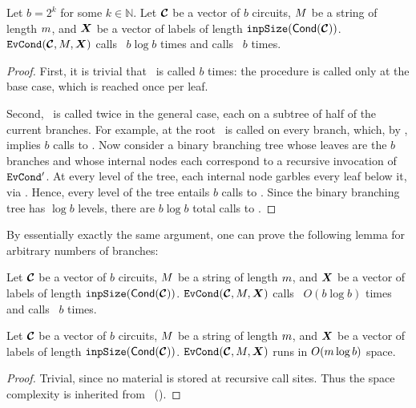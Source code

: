 \begin{lemma}\label{lemma:evcondtime}
  Let $b = 2^k$ for some $k \in \mathbb{N}$.
  Let $\vec{\cir}$ be a vector of $b$ circuits, $M$ be a string of
  length $m$, and $\gcirinp$ be a vector of labels of length
  $\inpsize(\conditional(\vec{\cir}))$.
  $\evcond(\vec{\cir}, \mat, \gcirinp)$ calls \gGb\ $b \log b$ times
  and calls \gEv\ $b$ times.
\end{lemma}
\begin{proof}
  First, it is trivial that \gEv\ is called $b$ times: the
  procedure is called only at the base case, which is reached once per
  leaf.

  Second, \gbtree\ is called twice in the general case, each on a
  subtree of half of the current branches.
  For example, at the root \gbtree\ is called on every branch, which, by
  , implies $b$ calls to \Gb.
  Now consider a binary branching tree whose leaves are the $b$
  branches and whose internal nodes each correspond to
  a recursive invocation of $\mathtt{EvCond}'$.
  At every level of the tree, each internal node garbles every
  leaf below it, via \gbtree.
  Hence, every level of the tree entails $b$ calls to \Gb.
  Since the binary branching tree has $\log b$ levels, there are $b
  \log b$ total calls to \Gb.
\end{proof}

By essentially exactly the same argument, one can prove the following
lemma for arbitrary numbers of branches:
\begin{lemma}\label{lemma:evcondtime-general}
  Let $\vec{\cir}$ be a vector of $b$ circuits, $M$ be a string of
  length $m$, and $\gcirinp$ be a vector of labels of length
  $\inpsize(\conditional(\vec{\cir}))$.
  $\evcond(\vec{\cir}, \mat, \gcirinp)$ calls \gGb\ $O(b \log b)$ times
  and calls \gEv\ $b$ times.
\end{lemma}

\begin{lemma}\label{lemma:evcondspace}
  Let $\vec{\cir}$ be a vector of $b$ circuits, $M$ be a string of
  length $m$, and $\gcirinp$ be a vector of labels of length
  $\inpsize(\conditional(\vec{\cir}))$.
  $\evcond(\vec{\cir}, \mat, \gcirinp)$ runs in $O(m \log b)$ space.
\end{lemma}
\begin{proof}
  Trivial, since no material is stored at recursive call sites.
  Thus the space complexity is inherited from
  \gbtree~().
\end{proof}

